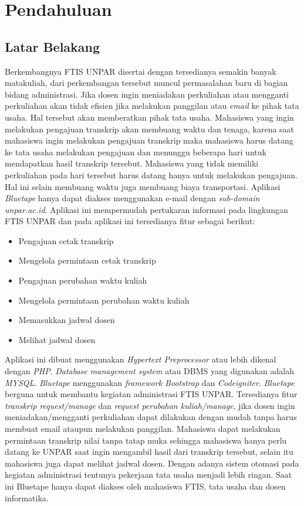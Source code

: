 \chapter{Pendahuluan}
\label{chap:intro}
   
\section{Latar Belakang}
\label{sec:label}
 Berkembangnya FTIS UNPAR disertai dengan tersedianya semakin banyak matakuliah, dari perkembangan tersebut muncul permasalahan baru di bagian bidang administrasi. Jika dosen ingin meniadakan perkuliahan atau mengganti perkuliahan akan tidak efisien jika melakukan panggilan atau \textit{email} ke pihak tata usaha. Hal tersebut akan memberatkan pihak tata usaha. Mahasiswa yang ingin melakukan pengajuan transkrip akan membuang waktu dan tenaga, karena saat mahasiswa ingin melakukan pengajuan transkrip maka mahasiswa harus datang ke tata usaha melakukan pengajuan dan menunggu beberapa hari untuk mendapatkan hasil transkrip tersebut. Mahasiswa yang tidak memiliki perkuliahan pada hari tersebut harus datang hanya untuk melakukan pengajuan. Hal ini selain membuang waktu juga membuang biaya transportasi. Aplikasi \textit{Bluetape} hanya dapat diakses menggunakan e-mail dengan \textit{sub-domain unpar.ac.id}. Aplikasi ini mempermudah pertukaran informasi pada lingkungan FTIS UNPAR dan pada aplikasi ini tersedianya fitur sebagai berikut:
 \begin{itemize}
 	\item Pengajuan cetak transkrip
 	\item Mengelola permintaan cetak transkrip
 	\item Pengajuan perubahan waktu kuliah
 	\item Mengelola permintaan perubahan waktu kuliah
 	\item Memasukkan jadwal dosen
 	\item Melihat jadwal dosen
 \end{itemize}

Aplikasi ini dibuat menggunakan \textit{Hypertext Preprocessor} atau lebih dikenal dengan \textit{PHP}. \textit{Database management system} atau DBMS yang digunakan adalah \textit{MYSQL}. \textit{ Bluetape} menggunakan \textit{framework Bootstrap} dan \textit{Codeigniter}. \textit{Bluetape} berguna untuk membantu kegiatan administrasi FTIS UNPAR. Tersedianya fitur \textit{transkrip request/manage} dan \textit{request perubahan kuliah/manage}, jika dosen ingin meniadakan/mengganti perkuliahan dapat dilakukan dengan mudah tanpa harus membuat email ataupun melakukan panggilan. Mahasiswa dapat melakukan permintaan transkrip nilai tanpa tatap muka sehingga mahasiswa hanya perlu datang ke UNPAR saat ingin mengambil hasil dari transkrip tersebut, selain itu mahasiswa juga dapat melihat jadwal dosen. Dengan adanya sistem otomasi pada kegiatan administrasi tentunya pekerjaan tata usaha menjadi lebih ringan. Saat ini Bluetape hanya dapat diakses oleh mahasiswa FTIS, tata usaha dan dosen informatika.  


